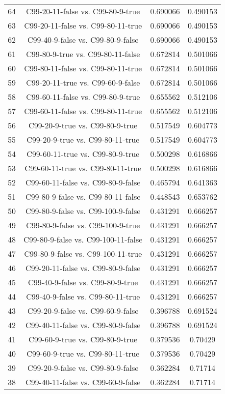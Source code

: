 \documentclass[a4paper,10pt]{article}
\begin{document}
\begin{landscape}
\begin{table}[!htp]
\begin{tabular}{cccc}
64&C99-20-11-false vs. C99-80-9-true&0.690066&0.490153\\
63&C99-20-11-false vs. C99-80-11-true&0.690066&0.490153\\
62&C99-40-9-false vs. C99-80-9-false&0.690066&0.490153\\
61&C99-80-9-true vs. C99-80-11-false&0.672814&0.501066\\
60&C99-80-11-false vs. C99-80-11-true&0.672814&0.501066\\
59&C99-20-11-true vs. C99-60-9-false&0.672814&0.501066\\
58&C99-60-11-false vs. C99-80-9-true&0.655562&0.512106\\
57&C99-60-11-false vs. C99-80-11-true&0.655562&0.512106\\
56&C99-20-9-true vs. C99-80-9-true&0.517549&0.604773\\
55&C99-20-9-true vs. C99-80-11-true&0.517549&0.604773\\
54&C99-60-11-true vs. C99-80-9-true&0.500298&0.616866\\
53&C99-60-11-true vs. C99-80-11-true&0.500298&0.616866\\
52&C99-60-11-false vs. C99-80-9-false&0.465794&0.641363\\
51&C99-80-9-false vs. C99-80-11-false&0.448543&0.653762\\
50&C99-80-9-false vs. C99-100-9-false&0.431291&0.666257\\
49&C99-80-9-false vs. C99-100-9-true&0.431291&0.666257\\
48&C99-80-9-false vs. C99-100-11-false&0.431291&0.666257\\
47&C99-80-9-false vs. C99-100-11-true&0.431291&0.666257\\
46&C99-20-11-false vs. C99-80-9-false&0.431291&0.666257\\
45&C99-40-9-false vs. C99-80-9-true&0.431291&0.666257\\
44&C99-40-9-false vs. C99-80-11-true&0.431291&0.666257\\
43&C99-20-9-false vs. C99-60-9-false&0.396788&0.691524\\
42&C99-40-11-false vs. C99-80-9-false&0.396788&0.691524\\
41&C99-60-9-true vs. C99-80-9-true&0.379536&0.70429\\
40&C99-60-9-true vs. C99-80-11-true&0.379536&0.70429\\
39&C99-20-9-false vs. C99-80-9-false&0.362284&0.71714\\
38&C99-40-11-false vs. C99-60-9-false&0.362284&0.71714\\

\end{tabular}
\end{table}
\end{landscape}
\end{document}
